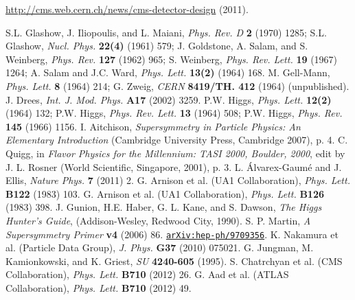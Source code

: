 \documentclass[12pt, letterpaper]{report}
\begin{document}
\begin{thebibliography}{99}


 \url{http://cms.web.cern.ch/news/cms-detector-design} (2011).


 S.L. Glashow, J. Iliopoulis, and L. Maiani, \textit{Phys. Rev. D} \textbf{2} (1970) 1285; S.L. Glashow, \textit{Nucl. Phys.} \textbf{22(4)} (1961) 579; J. Goldstone, A. Salam, and S. Weinberg, \textit{Phys. Rev.} \textbf{127} (1962) 965; S. Weinberg, \textit{Phys. Rev. Lett.} \textbf{19} (1967) 1264; A. Salam and J.C. Ward, \textit{Phys. Lett.} \textbf{13(2)} (1964) 168.
 M. Gell-Mann, \textit{Phys. Lett.} \textbf{8} (1964) 214; G. Zweig, \textit{CERN} \textbf{8419/TH. 412} (1964) (unpublished).
 J. Drees, \textit{Int. J. Mod. Phys.} \textbf{A17} (2002) 3259.
 P.W. Higgs, \textit{Phys. Lett.} \textbf{12(2)} (1964) 132; P.W. Higgs, \textit{Phys. Rev. Lett.} \textbf{13} (1964) 508; P.W. Higgs, \textit{Phys. Rev.} \textbf{145} (1966) 1156.
 I. Aitchison, \textit{Supersymmetry in Particle Physics: An Elementary Introduction} (Cambridge University Press, Cambridge 2007), p. 4.
 C. Quigg, in \textit{Flavor Physics for the Millennium: TASI 2000, Boulder, 2000}, edit by J. L. Rosner (World Scientific, Singapore, 2001), p. 3.
 L. \'{A}lvarex-Gaum\'{e} and J. Ellis, \textit{Nature Phys.} \textbf{7} (2011) 2.
 G. Arnison et al. (UA1 Collaboration), \textit{Phys. Lett.} \textbf{B122} (1983) 103.
 G. Arnison et al. (UA1 Collaboration), \textit{Phys. Lett.} \textbf{B126} (1983) 398.
 J. Gunion, H.E. Haber, G. L. Kane, and S. Dawson, \textit{The Higgs Hunter's Guide}, (Addison-Wesley, Redwood City, 1990).
 S. P. Martin, \textit{A Supersymmetry Primer} \textbf{v4} (2006) 86.  \href{http://arxiv.org/abs/hep-ph/9709356}{\texttt{arXiv:hep-ph/9709356}}.
 K. Nakamura et al. (Particle Data Group), \textit{J. Phys.} \textbf{G37} (2010) 075021.
 G. Jungman, M. Kamionkowski, and K. Griest, \textit{SU} \textbf{4240-605} (1995).
 S. Chatrchyan et al. (CMS Collaboration), \textit{Phys. Lett.} \textbf{B710} (2012) 26.
 G. Aad et al. (ATLAS Collaboration), \textit{Phys. Lett.} \textbf{B710} (2012) 49.


\end{thebibliography}
\end{document}
